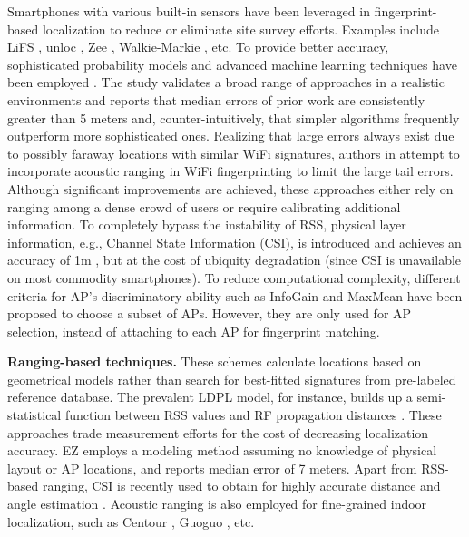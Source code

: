 \documentclass[10pt,conference,compsocconf,letterpaper]{./sty/IEEEtran}
\begin{document}
Smartphones with various built-in sensors have been leveraged in fingerprint-based localization to reduce or eliminate site survey efforts. Examples include LiFS \cite{yang_locating_2012}, unloc \cite{wang_no_2012}, Zee \cite{rai_zee_2012}, Walkie-Markie \cite{shen2013walkie}, etc. 
To provide better accuracy, sophisticated probability models and advanced machine learning techniques have been employed \cite{youssef_wlan_2003, youssef_handling_2004}. 
The study \cite{turner2011empirical} validates a broad range of approaches in a realistic environments and reports that median errors of prior work are consistently greater
than 5 meters and, counter-intuitively, that simpler algorithms frequently outperform more sophisticated ones. 
Realizing that large errors always exist due to possibly faraway locations with similar WiFi signatures, authors in \cite{nandakumar_centaur_2012, liu_push_2012} attempt to incorporate acoustic ranging in WiFi fingerprinting to limit the large tail errors. Although significant improvements are achieved, these approaches either rely on ranging among a dense crowd of users or require calibrating additional information. To completely bypass the instability of RSS, physical layer information, e.g., Channel State Information (CSI), is introduced and achieves an accuracy of 1m \cite{sen_you_2012}, but at the cost of ubiquity degradation (since CSI is unavailable on most commodity smartphones). 
To reduce computational complexity, different criteria for AP's discriminatory ability such as InfoGain \cite{chen2006power} and MaxMean \cite{youssef_wlan_2003} have been proposed to choose a subset of APs. However, they are only used for AP selection, instead of attaching to each AP for fingerprint matching.


\textbf{Ranging-based techniques.} These schemes calculate locations based on geometrical models rather than search for best-fitted signatures from pre-labeled reference database. The prevalent LDPL model, for instance, builds up a semi-statistical function between RSS values and RF propagation distances \cite{lim_zero_2010,chintalapudi_indoor_2010}. These approaches trade measurement efforts for the cost of decreasing localization accuracy. EZ \cite{chintalapudi_indoor_2010} employs a modeling method assuming no knowledge of physical layout or AP locations, and reports median error of 7 meters. 
Apart from RSS-based ranging, CSI is recently used to obtain for highly accurate distance and angle estimation \cite{sen2013avoid}. Acoustic ranging is also employed for fine-grained indoor localization, such as Centour \cite{nandakumar_centaur_2012}, Guoguo \cite{liu2013guoguo}, etc. 
\end{document}
